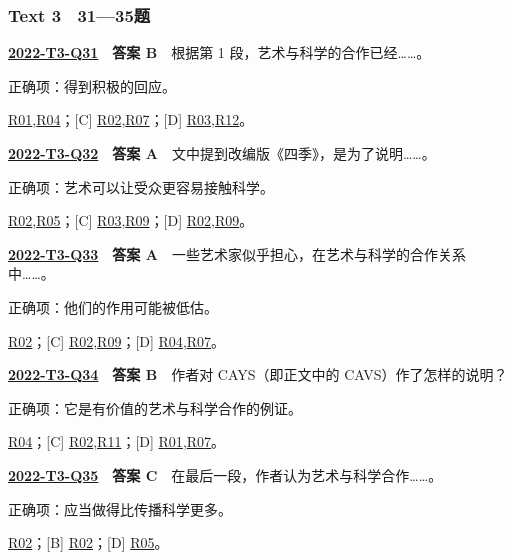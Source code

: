 \documentclass[11pt,a4paper]{article}
\begin{document}
\subsubsection{Text 3　31—35题}
\label{idx-2022-T3-Q31}
\noindent\textbf{\href{https://zj139.github.io/math-notes/english/d6c78c3352edb2e48c17944f/\#q31}{2022-T3-Q31}　答案 B}　根据第 1 段，艺术与科学的合作已经……。\par\nopagebreak
\noindent 正确项：得到积极的回应。\par\nopagebreak
\noindent [A] \hyperref[cat-R01]{R01},\hyperref[cat-R04]{R04}；[C] \hyperref[cat-R02]{R02},\hyperref[cat-R07]{R07}；[D] \hyperref[cat-R03]{R03},\hyperref[cat-R12]{R12}。
\par\smallskip
{}\label{idx-2022-T3-Q32}
\noindent\textbf{\href{https://zj139.github.io/math-notes/english/d6c78c3352edb2e48c17944f/\#q32}{2022-T3-Q32}　答案 A}　文中提到改编版《四季》，是为了说明……。\par\nopagebreak
\noindent 正确项：艺术可以让受众更容易接触科学。\par\nopagebreak
\noindent [B] \hyperref[cat-R02]{R02},\hyperref[cat-R05]{R05}；[C] \hyperref[cat-R03]{R03},\hyperref[cat-R09]{R09}；[D] \hyperref[cat-R02]{R02},\hyperref[cat-R09]{R09}。
\par\smallskip
{}\label{idx-2022-T3-Q33}
\noindent\textbf{\href{https://zj139.github.io/math-notes/english/d6c78c3352edb2e48c17944f/\#q33}{2022-T3-Q33}　答案 A}　一些艺术家似乎担心，在艺术与科学的合作关系中……。\par\nopagebreak
\noindent 正确项：他们的作用可能被低估。\par\nopagebreak
\noindent [B] \hyperref[cat-R02]{R02}；[C] \hyperref[cat-R02]{R02},\hyperref[cat-R09]{R09}；[D] \hyperref[cat-R04]{R04},\hyperref[cat-R07]{R07}。
\par\smallskip
{}\label{idx-2022-T3-Q34}
\noindent\textbf{\href{https://zj139.github.io/math-notes/english/d6c78c3352edb2e48c17944f/\#q34}{2022-T3-Q34}　答案 B}　作者对 CAYS（即正文中的 CAVS）作了怎样的说明？\par\nopagebreak
\noindent 正确项：它是有价值的艺术与科学合作的例证。\par\nopagebreak
\noindent [A] \hyperref[cat-R04]{R04}；[C] \hyperref[cat-R02]{R02},\hyperref[cat-R11]{R11}；[D] \hyperref[cat-R01]{R01},\hyperref[cat-R07]{R07}。
\par\smallskip
{}\label{idx-2022-T3-Q35}
\noindent\textbf{\href{https://zj139.github.io/math-notes/english/d6c78c3352edb2e48c17944f/\#q35}{2022-T3-Q35}　答案 C}　在最后一段，作者认为艺术与科学合作……。\par\nopagebreak
\noindent 正确项：应当做得比传播科学更多。\par\nopagebreak
\noindent [A] \hyperref[cat-R02]{R02}；[B] \hyperref[cat-R02]{R02}；[D] \hyperref[cat-R05]{R05}。
\par\smallskip
\end{document}
